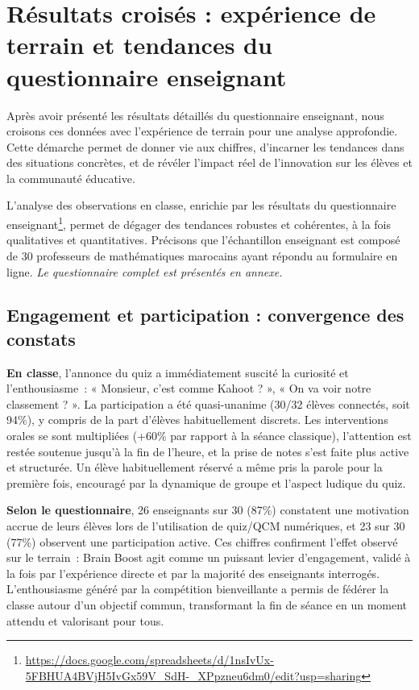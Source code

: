 \documentclass[a4paper,11pt]{report}
\begin{document}
\section{Résultats croisés : expérience de terrain et tendances du questionnaire enseignant}

Après avoir présenté les résultats détaillés du questionnaire enseignant, nous croisons ces données avec l'expérience de terrain pour une analyse approfondie. Cette démarche permet de donner vie aux chiffres, d'incarner les tendances dans des situations concrètes, et de révéler l'impact réel de l'innovation sur les élèves et la communauté éducative.

L'analyse des observations en classe, enrichie par les résultats du questionnaire enseignant\footnote{\url{https://docs.google.com/spreadsheets/d/1nsIvUx-5FBHUA4BVjH5IvGx59V_SdH-_XPpzneu6dm0/edit?usp=sharing}}, permet de dégager des tendances robustes et cohérentes, à la fois qualitatives et quantitatives. Précisons que l'échantillon enseignant est composé de 30 professeurs de mathématiques marocains ayant répondu au formulaire en ligne.\newline
\textit{Le questionnaire complet est présentés en annexe.}

\subsection{Engagement et participation : convergence des constats}
\textbf{En classe}, l'annonce du quiz a immédiatement suscité la curiosité et l'enthousiasme : « Monsieur, c'est comme Kahoot ? », « On va voir notre classement ? ». La participation a été quasi-unanime (30/32 élèves connectés, soit 94\%), y compris de la part d'élèves habituellement discrets. Les interventions orales se sont multipliées (+60\% par rapport à la séance classique), l'attention est restée soutenue jusqu'à la fin de l'heure, et la prise de notes s'est faite plus active et structurée. Un élève habituellement réservé a même pris la parole pour la première fois, encouragé par la dynamique de groupe et l'aspect ludique du quiz.

\textbf{Selon le questionnaire}, 26 enseignants sur 30 (87\%) constatent une motivation accrue de leurs élèves lors de l'utilisation de quiz/QCM numériques, et 23 sur 30 (77\%) observent une participation active. Ces chiffres confirment l'effet observé sur le terrain : Brain Boost agit comme un puissant levier d'engagement, validé à la fois par l'expérience directe et par la majorité des enseignants interrogés. L'enthousiasme généré par la compétition bienveillante a permis de fédérer la classe autour d'un objectif commun, transformant la fin de séance en un moment attendu et valorisant pour tous.
\end{document}
